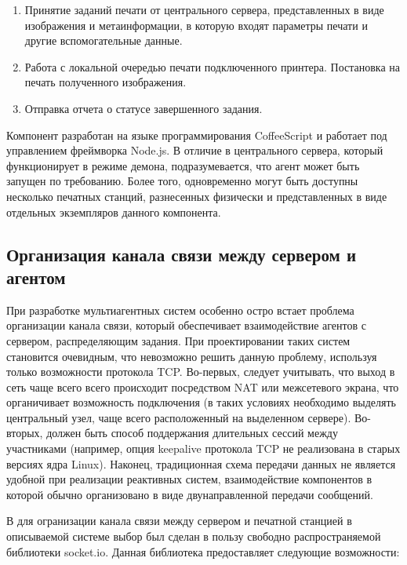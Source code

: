 \documentclass[a4paper,14pt,href]{article}
\begin{document}
\begin{enumerate}
  \item Принятие заданий печати от центрального сервера, представленных в виде изображения и метаинформации, в которую
  входят параметры печати и другие вспомогательные данные.

  \item Работа с локальной очередью печати подключенного принтера. Постановка на печать полученного изображения.

  \item Отправка отчета о статусе завершенного задания.
\end{enumerate}

Компонент разработан на языке программирования CoffeeScript и работает под управлением фреймворка Node.js. В отличие в
центрального сервера, который функционирует в режиме демона, подразумевается, что агент может быть запущен по требованию.
Более того, одновременно могут быть доступны несколько печатных станций, разнесенных физически и представленных в виде
отдельных экземпляров данного компонента.

\subsection{Организация канала связи между сервером и агентом}
При разработке мультиагентных систем особенно остро встает проблема организации канала связи, который обеспечивает
взаимодействие агентов с сервером, распределяющим задания. При проектировании таких систем становится очевидным, что
невозможно решить данную проблему, используя только возможности протокола TCP. Во-первых, следует учитывать, что
выход в сеть чаще всего всего происходит посредством NAT или межсетевого экрана, что органичивает возможность
подключения (в таких условиях необходимо выделять центральный узел, чаще всего расположенный на выделенном сервере).
Во-вторых, должен быть способ поддержания длительных сессий между участниками (например, опция keepalive\cite{Keepalive}
протокола TCP не реализована в старых версиях ядра Linux). Наконец, традиционная схема передачи данных не является
удобной при реализации реактивных систем, взаимодействие компонентов в которой обычно организовано в виде двунаправленной
передачи сообщений.

В для огранизации канала связи между сервером и печатной станцией в описываемой системе выбор был сделан в пользу
свободно распространяемой библиотеки socket.io\cite{SocketIO}. Данная библиотека предоставляет следующие возможности:
\end{document}
